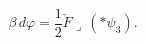 \begin{equation}
\beta\, d\varphi = \frac{1}{2} \check{F} \lrcorner \, (*\psi_3)
. \label{monop} 
\end{equation}


